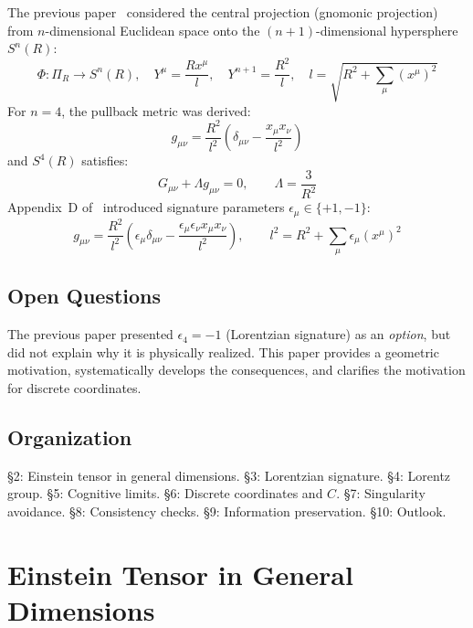 \documentclass[12pt,a4paper]{article}
\begin{document}
The previous paper~\cite{Paper1} considered the central projection (gnomonic projection) from $n$-dimensional Euclidean space onto the $(n+1)$-dimensional hypersphere $S^n(R)$:
\begin{equation}
\Phi: \Pi_R \to S^n(R), \quad Y^\mu = \frac{Rx^\mu}{l}, \quad Y^{n+1} = \frac{R^2}{l}, \quad l = \sqrt{R^2 + \sum_\mu (x^\mu)^2} \tag{1.1}
\end{equation}
For $n = 4$, the pullback metric was derived:
\begin{equation}
g_{\mu\nu} = \frac{R^2}{l^2}\left(\delta_{\mu\nu} - \frac{x_\mu x_\nu}{l^2}\right) \tag{1.2}
\end{equation}
and $S^4(R)$ satisfies:
\begin{equation}
G_{\mu\nu} + \Lambda g_{\mu\nu} = 0, \qquad \Lambda = \frac{3}{R^2} \tag{1.3}
\end{equation}
Appendix~D of~\cite{Paper1} introduced signature parameters $\epsilon_\mu \in \{+1, -1\}$:
\begin{equation}
g_{\mu\nu} = \frac{R^2}{l^2}\left(\epsilon_\mu \delta_{\mu\nu} - \frac{\epsilon_\mu \epsilon_\nu x_\mu x_\nu}{l^2}\right), \qquad l^2 = R^2 + \sum_\mu \epsilon_\mu (x^\mu)^2 \tag{1.4}
\end{equation}

\subsection{Open Questions}

The previous paper presented $\epsilon_4 = -1$ (Lorentzian signature) as an \emph{option}, but did not explain why it is physically realized. This paper provides a geometric motivation, systematically develops the consequences, and clarifies the motivation for discrete coordinates.

\subsection{Organization}

\S2: Einstein tensor in general dimensions. \S3: Lorentzian signature. \S4: Lorentz group. \S5: Cognitive limits. \S6: Discrete coordinates and $C$. \S7: Singularity avoidance. \S8: Consistency checks. \S9: Information preservation. \S10: Outlook.

\section{Einstein Tensor in General Dimensions}
\end{document}
